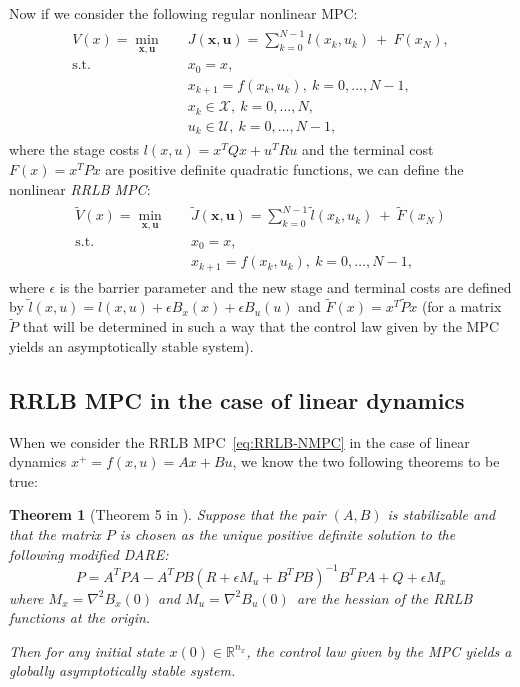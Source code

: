\documentclass[conference]{IEEEtran}
\newtheorem{theorem}{Theorem}[section]
\theoremstyle{definition}
\theoremstyle{remark}
\def\cal#1{\mathcal{#1}}
\def\bf#1{\mathbf{#1}}
\newcommand{\R}{\mathbb{R}}
\begin{document}
Now if we consider the following regular nonlinear MPC:
\begin{align}
	\begin{split}
		\label{eq:NMPC}
		V(x)=\underset{\bf{x},\bf{u}}{\min} &\quad J(\bf{x}, \bf{u})=\sum_{k=0}^{N-1}l(x_k,u_k)~+~F(x_N),\\
		\text{s.t.} &\quad x_0=x,\\
		&\quad x_{k+1}=f(x_k,u_k),~k=0,\ldots,N-1,\\
		&\quad x_k\in\cal{X},~k=0,\ldots,N,\\
		&\quad u_k\in\cal{U},~k=0,\ldots,N-1,
	\end{split}
\end{align}
where the stage costs $l(x,u)=x^TQx+u^TRu$ and the terminal cost $F(x)=x^TPx$ are positive definite quadratic functions, we can define the nonlinear \textit{RRLB MPC}:
\begin{align}
	\begin{split}\label{eq:RRLB-NMPC}
		\tilde{V}(x)=\underset{\bf{x},\bf{u}}{\min} &\quad \tilde{J}(\bf{x},\bf{u})=\sum_{k=0}^{N-1}\tilde{l}(x_k,u_k)~+~\tilde{F}(x_N)\\
		\text{s.t.} &\quad x_0=x,\\
		&\quad x_{k+1}=f(x_k,u_k),~k=0,\ldots,N-1,
	\end{split}
\end{align}
where $\epsilon$ is the barrier parameter and the new stage and terminal costs are defined by $\tilde{l}(x,u)=l(x,u)+\epsilon B_x(x)+\epsilon B_u(u)$ and $\tilde{F}(x)=x^T\tilde{P}x$ (for a matrix $\tilde{P}$ that will be determined in such a way that the control law given by the MPC yields an asymptotically stable system).

\subsection{RRLB MPC in the case of linear dynamics}

When we consider the RRLB MPC~\ref{eq:RRLB-NMPC} in the case of linear dynamics $x^+=f(x,u)=Ax+Bu$, we know the two following theorems to be true:

\begin{theorem}[Theorem 5 in \cite{RRLB-linear-MPC}]
	\label{nominal-stability-linear-case}
	Suppose that the pair $(A,B)$ is stabilizable and that the matrix $P$ is chosen as the unique positive definite solution to the following modified DARE:
	\begin{equation}
		P=A^TPA-A^TPB(R+\epsilon M_u+B^TPB)^{-1}B^TPA+Q+\epsilon M_x
	\end{equation}
	where $M_x=\nabla^2 B_x(0)$ and $M_u=\nabla^2 B_u(0)$\, are the hessian of the RRLB functions at the origin.

	Then for any initial state $x(0)\in\R^{n_x}$, the control law given by the MPC yields a globally asymptotically stable system.
\end{theorem}
\end{document}
